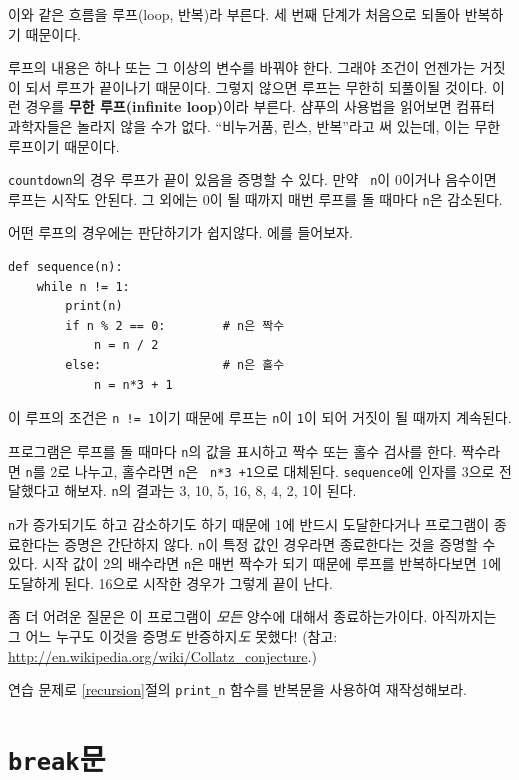\documentclass[10pt]{book}
\begin{document}
이와 같은 흐름을 루프(loop, 반복)라 부른다. 세 번째 단계가 처음으로
되돌아 반복하기 때문이다.

루프의 내용은 하나 또는 그 이상의 변수를 바꿔야 한다.  그래야 조건이
언젠가는 거짓이 되서 루프가 끝이나기 때문이다.  그렇지 않으면 루프는
무한히 되풀이될 것이다.  이런 경우를 {\bf 무한 루프(infinite loop)}이라
부른다.  샴푸의 사용법을 읽어보면 컴퓨터 과학자들은 놀라지 않을 수가
없다.  ``비누거품, 린스, 반복''라고 써 있는데, 이는 무한 루프이기
때문이다.

{\tt countdown}의 경우 루프가 끝이 있음을 증명할 수 있다.  만약 {\tt
  n}이 0이거나 음수이면 루프는 시작도 안된다.  그 외에는 0이 될 때까지
매번 루프를 돌 때마다 {\tt n}은 감소된다.

어떤 루프의 경우에는 판단하기가 쉽지않다.  에를 들어보자. 

\begin{verbatim}
def sequence(n):
    while n != 1:
        print(n)
        if n % 2 == 0:        # n은 짝수
            n = n / 2
        else:                 # n은 홀수
            n = n*3 + 1
\end{verbatim}
%
이 루프의 조건은 {\tt n != 1}이기 때문에 루프는 {\tt n}이 {\tt 1}이
되어 거짓이 될 때까지 계속된다.

프로그램은 루프를 돌 때마다 {\tt n}의 값을 표시하고 짝수 또는 홀수
검사를 한다.  짝수라면 {\tt n}를 2로 나누고, 홀수라면 {\tt n}은 {\tt
  n*3 +1}으로 대체된다.  {\tt sequence}에 인자를 3으로 전달했다고
해보자.  {\tt n}의 결과는 3, 10, 5, 16, 8, 4, 2, 1이 된다.

{\tt n}가 증가되기도 하고 감소하기도 하기 때문에 1에 반드시
도달한다거나 프로그램이 종료한다는 증명은 간단하지 않다.  {\tt n}이
특정 값인 경우라면 종료한다는 것을 증명할 수 있다.  시작 값이 2의
배수라면 {\tt n}은 매번 짝수가 되기 때문에 루프를 반복하다보면 1에
도달하게 된다.  16으로 시작한 경우가 그렇게 끝이 난다.

좀 더 어려운 질문은 이 프로그램이 {\em 모든} 양수에 대해서
종료하는가이다.  아직까지는 그 어느 누구도 이것을 증명{\em 도}
반증하지{\em 도} 못했다!  (참고:
\url{http://en.wikipedia.org/wiki/Collatz_conjecture}.)

연습 문제로 \ref{recursion}절의 \verb"print_n" 함수를 반복문을 사용하여
재작성해보라.


\section{{\tt break}문}
\end{document}
